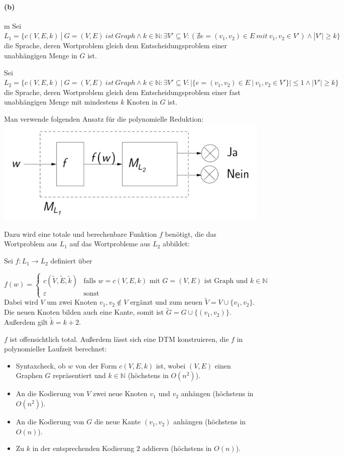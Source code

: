 \paragraph{(b)}m
	Sei	$L_1=\{c(V,E,k)\ |\ G=(V,E)\ ist\ Graph \wedge k\in \mathbb{N}: \exists V' \subseteq V:(\nexists e=(v_1,v_2)\in E\ mit\ v_1,v_2 \in V') \wedge |V'|\geq k \}$\\
	die Sprache, deren Wortproblem gleich dem Entscheidungsproblem einer unabhängigen Menge in $G$ ist.

	Sei	$L_2=\{c(V,E,k)\ |\ G=(V,E)\ ist\ Graph \wedge k\in \mathbb{N}: \exists V' \subseteq V:|\{e=(v_1,v_2)\in E\ |\ v_1,v_2 \in V'\}|\leq 1 \wedge |V'|\geq k \}$\\
	die Sprache, deren Wortproblem gleich dem Entscheidungsproblem einer fast unabhängigen Menge mit mindestens $k$ Knoten in $G$ ist.

	Man verwende folgenden Ansatz für die polynomielle Reduktion:\\
	\includegraphics[scale=0.4]{sol/thinf/f23t2/reduction_idee_skizze}

	Dazu wird eine totale und berechenbare Funktion $f$ benötigt, die das Wortproblem aus $L_1$ auf das Wortprobleme aus $L_2$ abbildet:

	Sei $f:L_1 \rightarrow L_2$ definiert über

	$f(w)=\begin{cases}
		c(\tilde{V},\tilde{E},\tilde{k})&\text{falls $w=c(V,E,k)$ mit $G=(V,E)$ ist Graph und $k \in \mathbb{N}$}\\
		\varepsilon &\text{sonst}
	\end{cases}$\\
	Dabei wird $V$ um zwei Knoten $v_1,v_2 \notin V$ ergänzt und zum neuen $\tilde{V}=V\cup \{v_1,v_2\}$. Die neuen Knoten bilden auch eine Kante, somit ist $\tilde{G}=G\cup \{(v_1,v_2)\}$. Außerdem gilt $\tilde{k}=k+2$.

	$f$ ist offensichtlich total. Außerdem lässt sich eine DTM konstruieren, die $f$ in polynomieller Laufzeit berechnet:
	\begin{itemize}
		\item Syntaxcheck, ob $w$ von der Form $c(V,E,k)$ ist, wobei $(V,E)$ einen Graphen $G$ repräsentiert und $k \in \mathbb{N}$ (höchstens in $O(n^2)$).
		\item An die Kodierung von $V$ zwei neue Knoten $v_1$ und $v_2$ anhängen (höchstens in $O(n^2)$).
		\item An die Kodierung von $G$ die neue Kante $(v_1,v_2)$ anhängen (höchstens in $O(n)$).
		\item Zu $k$ in der entsprechenden Kodierung $2$ addieren (höchstens in $O(n)$).
	\end{itemize}

